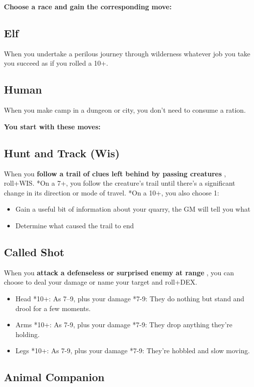 {\bfseries Choose a race and gain the corresponding move:}
\subsection{Elf}

When you undertake a perilous journey through wilderness whatever job you take you succeed as if you rolled a 10+.
\subsection{Human}

When you make camp in a dungeon or city, you don't need to consume a ration.

\vspace{\baselineskip}
{\bfseries You start with these moves:}
\subsection{Hunt and Track (Wis)}

When you \textbf{follow a trail of clues left behind by passing creatures}
, roll+WIS. *On a 7+, you follow the creature's trail until there's a significant change in its direction or mode of travel. *On a 10+, you also choose 1:
\begin{itemize}
\item Gain a useful bit of information about your quarry, the GM will tell you what
\item Determine what caused the trail to end

\end{itemize}
\subsection{Called Shot}

When you \textbf{attack a defenseless or surprised enemy at range}
, you can choose to deal your damage or name your target and roll+DEX.
\begin{itemize}
\item Head *10+: As 7--9, plus your damage *7-9: They do nothing but stand and drool for a few moments.
\item Arms *10+: As 7-9, plus your damage *7-9: They drop anything they're holding.
\item Legs *10+: As 7-9, plus your damage *7-9: They're hobbled and slow moving.

\end{itemize}
\subsection{Animal Companion}

